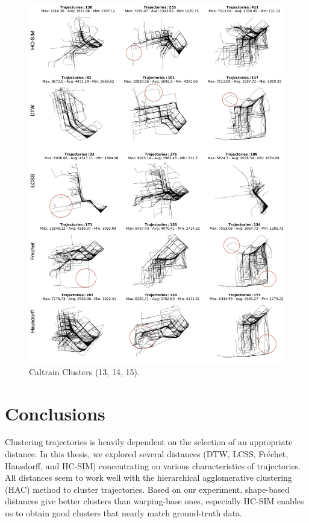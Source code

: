 \documentclass[a4paper, 12pt]{article}
\begin{document}
\begin{figure}[htbp!]
    \centering
    \includegraphics[width=1\textwidth]{Caltrain 5.png}
    \caption{Caltrain Clusters (13, 14, 15).}
    \label{fig44}
\end{figure}

\pagebreak

\section{Conclusions}
Clustering trajectories is heavily dependent on the selection of an appropriate distance. In this thesis, we explored several distances (DTW, LCSS, Fréchet, Hausdorff, and HC-SIM) concentrating on various characteristics of trajectories. All distances seem to work well with the hierarchical agglomerative clustering (HAC) method to cluster trajectories. Based on our experiment, shape-based distances give better clusters than warping-base ones, especially HC-SIM enables us to obtain good clusters that nearly match ground-truth data. 
\end{document}
